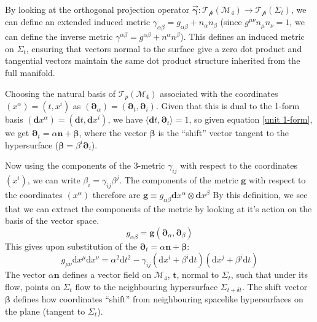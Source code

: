 \documentclass[aps,prd,reprint,preprintnumbers,showpacs,floatfix,nofootinbib,superscript address]{revtex4-2}
\begin{document}
By looking at the orthogonal projection operator $\Vec{\mathbf{\gamma}} : \mathcal{T_p}(\mathcal{M}_4) \rightarrow \mathcal{T_p}(\Sigma_t)$, we can define an extended induced metric $\gamma_{\alpha\beta} = g_{\alpha\beta} + n_\alpha n_\beta$ (since $g^{\mu\nu} n_\mu n_\nu = 1$, we can define the inverse metric $\gamma^{\alpha\beta} = g^{\alpha\beta} + n^\alpha n^\beta$). This defines an induced metric on $\Sigma_t$, ensuring that vectors normal to the surface give a zero dot product and tangential vectors maintain the same dot product structure inherited from the full manifold. 

Choosing the natural basis of $\mathcal{T}_p(\mathcal{M}_4)$ associated with the coordinates $(x^\alpha) =(t,x^i)$ as $(\bm{\partial}_\alpha)=(\bm{\partial}_t, \bm{\partial}_i)$. Given that this is dual to the 1-form basis $(\textbf{d}x^\alpha) = (\textbf{d}t, \textbf{d}x^i)$, we have $\langle \textbf{d}t, \bm{\partial}_t \rangle = 1$, so given equation \ref{unit 1-form}, we get $\bm{\partial}_t = \alpha \bm{n} + \bm{\beta}$, where the vector $\bm{\beta}$ is the ``shift'' vector tangent to the hypersurface ($\bm{\beta} = \beta^i \boldsymbol{\partial}_i$). 

Now using the components of the 3-metric $\gamma_{i j}$ with respect to the coordinates $(x^i)$, we can write $\beta_i = \gamma_{ij}\beta^j$. The components of the metric $\bm{g}$ with respect to the coordinates $(x^\alpha)$ therefore are $\bm{g} \equiv g_{\alpha \beta} \textbf{d}x^\alpha \otimes \textbf{d}x^\beta$
By this definition, we see that we can extract the components of the metric by looking at it's action on the basis of the vector space. 
\begin{equation}
    g_{\alpha\beta} = \bm{g} (\bm{\partial}_\alpha, \bm{\partial}_\beta)
\end{equation}
This gives upon substitution of the $\bm{\partial}_t = \alpha \bm{n} + \bm{\beta}$:
\begin{equation} \label{General split Metric}
    g_{\mu \nu} \text{d}x^\mu\text{d}x^\nu = \alpha^2 \text{d}t^2 - \gamma_{ij}(\text{d}x^i + \beta^i \text{d}t)(\text{d}x^j + \beta^j \text{d}t)
\end{equation}
The vector $\alpha \bm{n}$ defines a vector field on $\mathcal{M}_4$, $\bm{t}$, normal to $\Sigma_t$, such that under its flow, points on $\Sigma_t$ flow to the neighbouring hypersurface $\Sigma_{t+\delta t}$. The shift vector $\bm{\beta}$ defines how coordinates ``shift'' from neighbouring spacelike hypersurfaces on the plane (tangent to $\Sigma_t$). 
\end{document}
